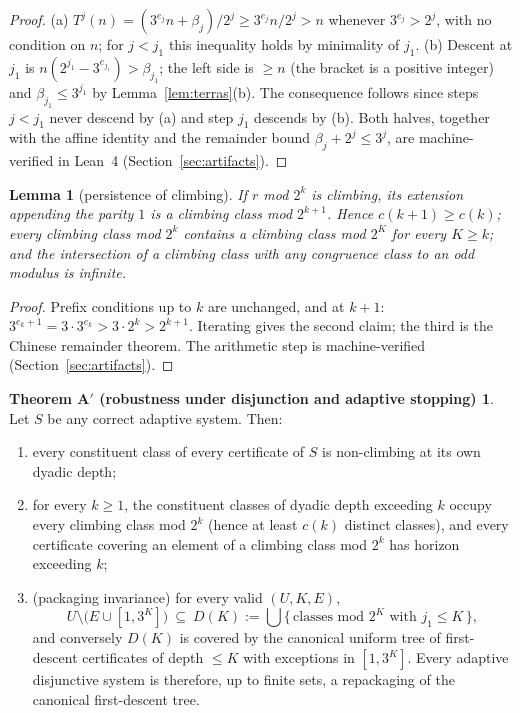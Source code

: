 \documentclass[11pt]{article}
\newtheorem{lemma}[theorem]{Lemma}
\theoremstyle{definition}
\newtheorem*{thmAp}{Theorem A$'$ (robustness under disjunction and adaptive stopping)}
\begin{document}
\begin{proof}
(a) $T^j(n)=(3^{e_j}n+\beta_j)/2^j\ge 3^{e_j}n/2^j>n$ whenever
$3^{e_j}>2^j$, with no condition on $n$; for $j<j_1$ this inequality holds
by minimality of $j_1$. (b) Descent at $j_1$ is
$n(2^{j_1}-3^{e_{j_1}})>\beta_{j_1}$; the left side is $\ge n$ (the bracket
is a positive integer) and $\beta_{j_1}\le 3^{j_1}$ by
Lemma~\ref{lem:terras}(b). The consequence follows since steps $j<j_1$
never descend by (a) and step $j_1$ descends by (b). Both halves, together
with the affine identity and the remainder bound $\beta_j+2^j\le 3^j$, are
machine-verified in Lean~4 (Section~\ref{sec:artifacts}).
\end{proof}

\begin{lemma}[persistence of climbing]\label{lem:persist}
If $r$ mod $2^k$ is climbing, its extension appending the parity $1$ is a
climbing class mod $2^{k+1}$. Hence $c(k+1)\ge c(k)$; every climbing class
mod $2^k$ contains a climbing class mod $2^K$ for every $K\ge k$; and the
intersection of a climbing class with any congruence class to an odd
modulus is infinite.
\end{lemma}

\begin{proof}
Prefix conditions up to $k$ are unchanged, and at $k+1$:
$3^{e_k+1}=3\cdot 3^{e_k}>3\cdot 2^k>2^{k+1}$. Iterating gives the second
claim; the third is the Chinese remainder theorem. The arithmetic step is
machine-verified (Section~\ref{sec:artifacts}).
\end{proof}

\begin{thmAp}
Let $S$ be any correct adaptive system. Then:
\begin{enumerate}
\item[(a)] every constituent class of every certificate of $S$ is
  non-climbing at its own dyadic depth;
\item[(b)] for every $k\ge 1$, the constituent classes of dyadic depth
  exceeding $k$ occupy every climbing class mod $2^k$ (hence at least
  $c(k)$ distinct classes), and every certificate covering an element of a
  climbing class mod $2^k$ has horizon exceeding $k$;
\item[(c)] (packaging invariance) for every valid $(U,K,E)$,
  \[
  U\setminus\bigl(E\cup[1,3^K]\bigr)\ \subseteq\ D(K):=
  \bigcup\{\,\text{classes mod } 2^K \text{ with } j_1\le K\,\},
  \]
  and conversely $D(K)$ is covered by the canonical uniform tree of
  first-descent certificates of depth $\le K$ with exceptions in
  $[1,3^K]$. Every adaptive disjunctive system is therefore, up to finite
  sets, a repackaging of the canonical first-descent tree.
\end{enumerate}
\end{thmAp}
\end{document}
